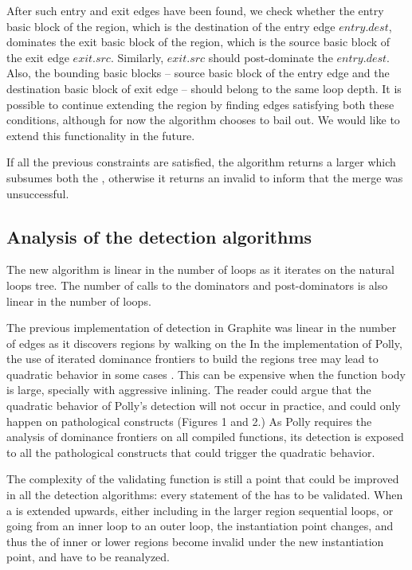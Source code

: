 \documentclass{sig-alternate}
\begin{document}
After such entry and exit edges have been found, we check whether the entry
basic block of the region, which is the destination of the entry edge
$entry.dest$, dominates the exit basic block of the region, which is the source
basic block of the exit edge $exit.src$.  Similarly, $exit.src$ should
post-dominate the $entry.dest$.  Also, the bounding basic blocks -- source basic
block of the entry edge and the destination basic block of exit edge -- should
belong to the same loop depth.  It is possible to continue extending the region
by finding edges satisfying both these conditions, although for now the
algorithm chooses to bail out.  We would like to extend this functionality in
the future.

If all the previous constraints are satisfied, the algorithm returns a larger
\SESE{} which subsumes both the , otherwise it returns an invalid
\SESE{} to inform that the merge was unsuccessful.

\subsection{Analysis of the \SCoP{} detection algorithms}
The new algorithm is linear in the number of loops as it iterates on the
natural loops tree.  The number of calls to the dominators and post-dominators
is also linear in the number of loops.

The previous implementation of \SCoP{} detection in Graphite was linear in the
number of \CFG{} edges as it discovers regions by walking on the   In the
implementation of Polly, the use of iterated dominance frontiers to build the
\SESE{} regions tree may lead to quadratic behavior in some cases
\cite{ramalingam}.  This can be expensive when the function body is large,
specially with aggressive inlining.  The reader could argue that the
quadratic behavior of Polly's \SCoP{} detection will not occur in practice, and
could only happen on pathological constructs \cite{cytron1995efficiently}
(Figures 1 and 2.)  As Polly requires the analysis of dominance frontiers on all
compiled functions, its \SCoP{} detection is exposed to all the pathological
constructs that could trigger the quadratic behavior.

The complexity of the validating function is still a point that could be improved
in all the \SCoP{} detection algorithms: every statement of the \SESE{} has to be
validated.  When a \SCoP{} is extended upwards, either including in the larger
region sequential loops, or going from an inner loop to an outer loop, the \scev{}
instantiation point changes, and thus the  of inner or lower regions become
invalid under the new instantiation point, and have to be reanalyzed.
\end{document}
